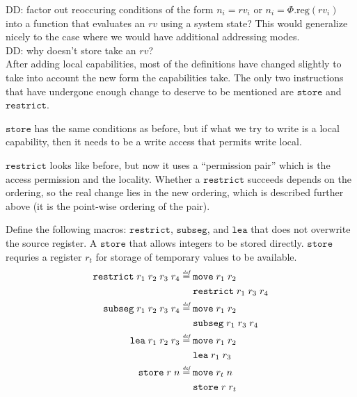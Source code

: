 \documentclass[a4paper]{article}
\newcommand{\defeq}{\stackrel{\textit{\tiny{def}}}{=}}
\newcommand\dominique[1]{{\color{purple} \sf \footnotesize {DD: #1}}\\}
\newcommand{\var}[1]{\mathit{#1}}
\newcommand{\rv}{\var{rv}}
\newcommand{\plainproj}[1]{\mathrm{#1}}
\newcommand{\memreg}[1][\Phi]{#1.\plainproj{reg}}
\newcommand{\zinstr}[1]{\mathtt{#1}}
\newcommand{\twoinstr}[3]{\zinstr{#1} \; #2 \; #3}
\newcommand{\move}[2]{\twoinstr{move}{#1}{#2}}
\newcommand{\store}[2]{\twoinstr{store}{#1}{#2}}
\newcommand{\lea}[2]{\twoinstr{lea}{#1}{#2}}
\newcommand{\threeinstr}[4]{\zinstr{#1} \; #2 \; #3 \; #4}
\newcommand{\restrict}[3]{\threeinstr{restrict}{#1}{#2}{#3}}
\newcommand{\subseg}[3]{\threeinstr{subseg}{#1}{#2}{#3}}
\begin{document}
\dominique{factor out reoccuring conditions of the form $n_i = \rv_i$ or $n_i =
  \memreg(\rv_i)$ into a function that evaluates an $\rv$ using a system state?
  This would generalize nicely to the case where we would have additional
  addressing modes.}

\dominique{why doesn't store take an $\rv$?}


After adding local capabilities, most of the definitions have changed slightly to take into account the new form the capabilities take. The only two instructions that have undergone enough change to deserve to be mentioned are $\mathtt{store}$ and $\mathtt{restrict}$. 

$\mathtt{store}$ has the same conditions as before, but if what we try to write is a local capability, then it needs to be a write access that permits write local.

$\mathtt{restrict}$ looks like before, but now it uses a ``permission pair'' which is the access permission and the locality. Whether a $\mathtt{restrict}$ succeeds depends on the ordering, so the real change lies in the new ordering, which is described further above (it is the point-wise ordering of the pair).

Define the following macros: $\mathtt{restrict}$, $\mathtt{subseg}$, and $\mathtt{lea}$ that does not overwrite the source register. A $\mathtt{store}$ that allows integers to be stored directly. $\mathtt{store}$ requries a register $r_t$ for storage of temporary values to be available.
\begin{align*}
  \restrict{r_1}{r_2}{r_3} \; r_4 &\defeq
                                    \begin{aligned}[t]
                                      & \move{r_1}{r_2} \\
                                      & \restrict{r_1}{r_3}{r_4}
                                    \end{aligned} \\
  \subseg{r_1}{r_2}{r_3} \; r_4   &\defeq
                                    \begin{aligned}[t]
                                      & \move{r_1}{r_2} \\
                                      & \subseg{r_1}{r_3}{r_4}
                                    \end{aligned}\\
  \lea{r_1}{r_2} \; r_3           &\defeq
                                    \begin{aligned}[t]
                                      & \move{r_1}{r_2} \\
                                      & \lea{r_1}{r_3}
                                    \end{aligned}\\
  \store{r}{n} &\defeq
                 \begin{aligned}[t]
                   & \move{r_t}{n} \\
                   & \store{r}{r_t}
                 \end{aligned}
\end{align*}
\end{document}
